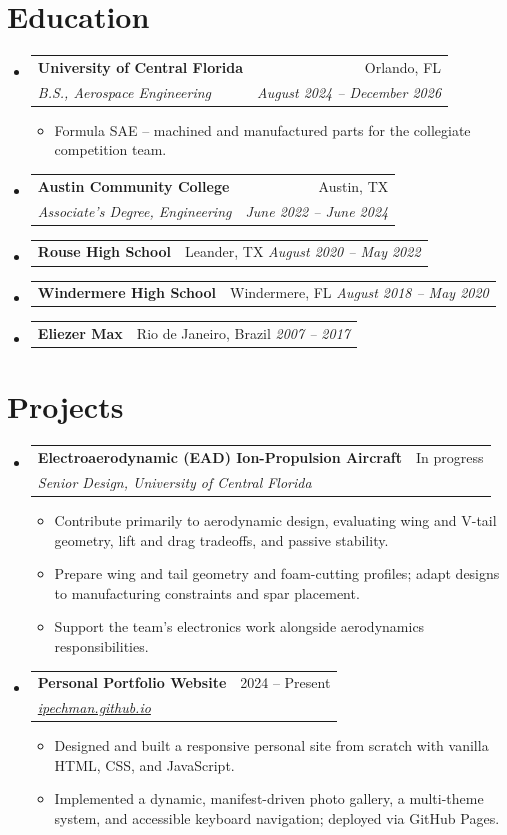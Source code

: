 \documentclass[10pt, letterpaper]{article}
\makeatletter
\newcommand{\resumeItem}[1]{\item\small{#1}}
\newcommand{\resumeExp}[4]{
  \item
  \begin{tabular*}{\textwidth}[t]{l@{\extracolsep{\fill}}r}
    \textbf{\color{accent}#1} & {\small #2} \\
    \textit{\small #3} & \textit{\small #4} \\
  \end{tabular*}\vspace{-5pt}
}
\newcommand{\resumeEdu}[4]{
  \item
  \begin{tabular*}{\textwidth}[t]{l@{\extracolsep{\fill}}r}
    \textbf{\color{accent}#1} & {\small #2} \\
    \textit{\small #3} & \textit{\small #4} \\
  \end{tabular*}\vspace{-5pt}
}
\newcommand{\resumeEduOne}[3]{
  \item
  \begin{tabular*}{\textwidth}[t]{l@{\extracolsep{\fill}}r}
    \textbf{\color{accent}#1} & {\small #2 \quad \textit{#3}} \\
  \end{tabular*}\vspace{-5pt}
}
\makeatother
\begin{document}
\section{Education}
\begin{itemize}[leftmargin=0.15in, label={}, itemsep=5pt]
  \resumeEdu{University of Central Florida}{Orlando, FL}{B.S., Aerospace Engineering}{August 2024 -- December 2026}
  \begin{itemize}[leftmargin=0.2in, label={\textbullet}, topsep=2pt, itemsep=1pt]
    \resumeItem{Formula SAE -- machined and manufactured parts for the collegiate competition team.}
  \end{itemize}
  \resumeEdu{Austin Community College}{Austin, TX}{Associate's Degree, Engineering}{June 2022 -- June 2024}
  \resumeEduOne{Rouse High School}{Leander, TX}{August 2020 -- May 2022}
  \resumeEduOne{Windermere High School}{Windermere, FL}{August 2018 -- May 2020}
  \resumeEduOne{Eliezer Max}{Rio de Janeiro, Brazil}{2007 -- 2017}
\end{itemize}

\section{Projects}
\begin{itemize}[leftmargin=0.15in, label={}, itemsep=3pt]
  \resumeExp{Electroaerodynamic (EAD) Ion-Propulsion Aircraft}{In progress}{Senior Design, University of Central Florida}{}
  \begin{itemize}[leftmargin=0.2in, label={\textbullet}, topsep=2pt, itemsep=1pt]
    \resumeItem{Contribute primarily to aerodynamic design, evaluating wing and V-tail geometry, lift and drag tradeoffs, and passive stability.}
    \resumeItem{Prepare wing and tail geometry and foam-cutting profiles; adapt designs to manufacturing constraints and spar placement.}
    \resumeItem{Support the team's electronics work alongside aerodynamics responsibilities.}
  \end{itemize}
  \resumeExp{Personal Portfolio Website}{2024 -- Present}{\href{https://ipechman.github.io}{ipechman.github.io}}{}
  \begin{itemize}[leftmargin=0.2in, label={\textbullet}, topsep=2pt, itemsep=1pt]
    \resumeItem{Designed and built a responsive personal site from scratch with vanilla HTML, CSS, and JavaScript.}
    \resumeItem{Implemented a dynamic, manifest-driven photo gallery, a multi-theme system, and accessible keyboard navigation; deployed via GitHub Pages.}
  \end{itemize}
\end{itemize}
\end{document}
